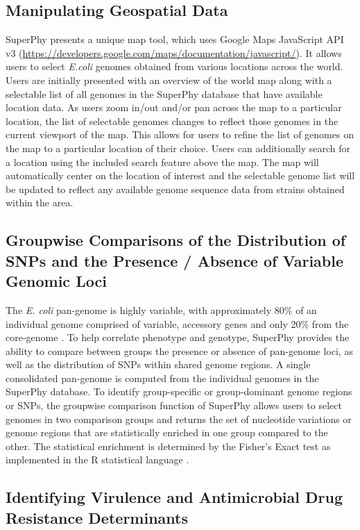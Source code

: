 \documentclass[a4paper,twoside]{article}
\begin{document}
\subsection{Manipulating Geospatial Data}
SuperPhy presents a unique map tool, which uses Google Maps JavaScript API v3 (\url{https://developers.google.com/maps/documentation/javascript/}). It allows users to select \textit{E.coli} genomes obtained from various locations across the world. Users are initially presented with an overview of the world map along with a selectable list of all genomes in the SuperPhy database that have available location data. As users zoom in/out and/or pan across the map to a particular location, the list of selectable genomes changes to reflect those genomes in the current viewport of the map. This allows for users to refine the list of genomes on the map to a particular location of their choice. Users can additionally search for a location using the included search feature above the map. The map will automatically center on the location of interest and the selectable genome list will be updated to reflect any available genome sequence data from strains obtained within the area.  

\subsection{Groupwise Comparisons of the Distribution of SNPs and the Presence / Absence of Variable Genomic Loci}

The \textit{E. coli} pan-genome is highly variable, with approximately 80\% of an individual genome comprised of variable, accessory genes and only 20\% from the core-genome \cite{lukjancenko_comparison_2010}. To help correlate phenotype and genotype, SuperPhy provides the ability to compare between groups the presence or absence of pan-genome loci, as well as the distribution of SNPs within shared genome regions. A single consolidated pan-genome is computed from the individual genomes in the SuperPhy database. To identify group-specific or group-dominant genome regions or SNPs, the groupwise comparison function of SuperPhy allows users to select genomes in two comparison groups and returns the set of nucleotide variations or genome regions that are statistically enriched in one group compared to the other. The statistical enrichment is determined by the Fisher's Exact test as implemented in the R statistical language \cite{R_manual}.


\subsection{Identifying Virulence and Antimicrobial Drug Resistance Determinants}
\end{document}
